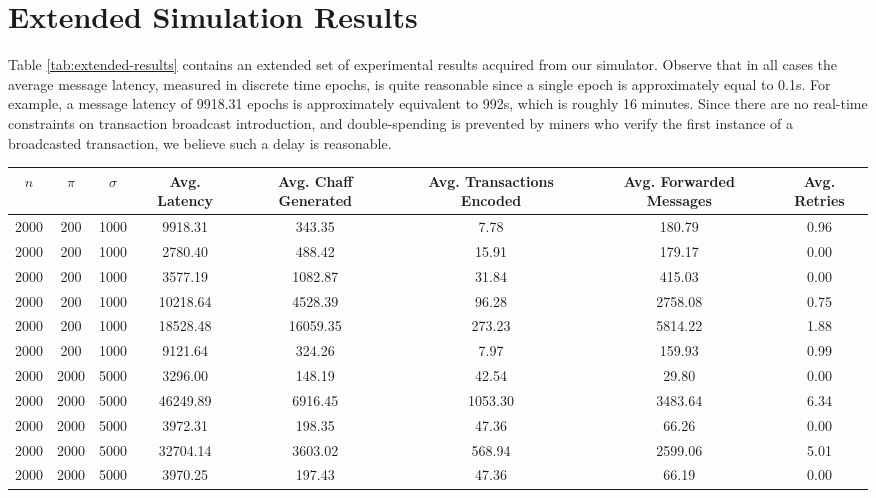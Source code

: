 \documentclass[conference]{IEEEtran}
\begin{document}
\section{Extended Simulation Results}
Table \ref{tab:extended-results} contains an extended set of experimental results acquired from our simulator. Observe that in all cases the average message latency, measured in discrete time epochs, is quite reasonable since a single epoch is approximately equal to 0.1s. For example, a message latency of 9918.31 epochs is approximately equivalent to 992s, which is roughly 16 minutes. Since there are no real-time constraints on transaction broadcast introduction, and double-spending is prevented by miners who verify the first instance of a broadcasted transaction, we believe such a delay is reasonable.
\begin{table*}
\begin{center}
\caption{Extended simulation results including average message latency and traffic generation rates ($\pi$ and $\sigma$).}
\label{tab:extended-results}
    \begin{tabular}{|c|c|c|c|c|c|c|c|} \hline
    $n$ & $\pi$ & $\sigma$ & {\bf Avg. Latency} & {\bf Avg. Chaff Generated} & {\bf Avg. Transactions Encoded} & {\bf Avg. Forwarded Messages} & {\bf Avg. Retries} \\ \hline
2000 & 200 & 1000 & 9918.31 & 343.35 & 7.78 & 180.79 & 0.96 \\
2000 & 200 & 1000 & 2780.40 & 488.42 & 15.91 & 179.17 & 0.00 \\
2000 & 200 & 1000 & 3577.19 & 1082.87 & 31.84 & 415.03 & 0.00 \\
2000 & 200 & 1000 & 10218.64 & 4528.39 & 96.28 & 2758.08 & 0.75 \\
2000 & 200 & 1000 & 18528.48 & 16059.35 & 273.23 & 5814.22 & 1.88 \\
2000 & 200 & 1000 & 9121.64 & 324.26 & 7.97 & 159.93 & 0.99 \\
2000 & 2000 & 5000 & 3296.00 & 148.19 & 42.54 & 29.80 & 0.00 \\
2000 & 2000 & 5000 & 46249.89 & 6916.45 & 1053.30 & 3483.64 & 6.34 \\
2000 & 2000 & 5000 & 3972.31 & 198.35 & 47.36 & 66.26 & 0.00 \\
2000 & 2000 & 5000 & 32704.14 & 3603.02 & 568.94 & 2599.06 & 5.01 \\
2000 & 2000 & 5000 & 3970.25 & 197.43 & 47.36 & 66.19 & 0.00 \\

\end{tabular}
\end{center}
\end{table*}
\end{document}
